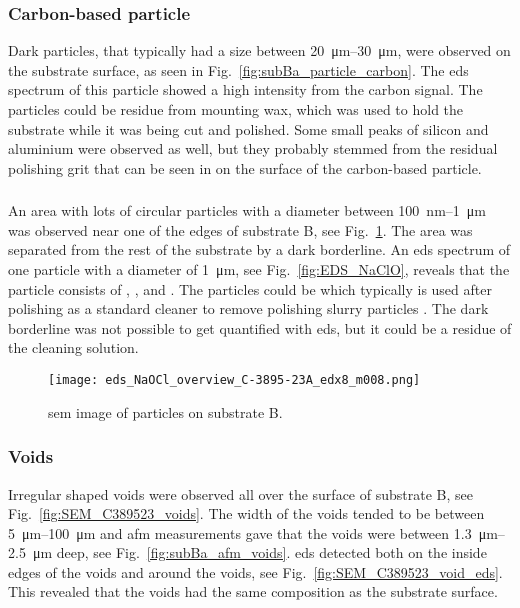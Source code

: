 \subsubsection{Carbon-based particle}
Dark particles, that typically had a size between \SIrange{20}{30}{\micro\metre}, were observed on the substrate surface, as seen in Fig.~\ref{fig:subBa_particle_carbon}. The \ac{eds} spectrum of this particle showed a high intensity from the carbon signal. The particles could be residue from mounting wax, which was used to hold the substrate while it was being cut and polished. Some small peaks of silicon and aluminium were observed as well, but they probably stemmed from the residual polishing grit that can be seen in on the surface of the carbon-based particle.

\subsubsection{}
An area with lots of circular particles with a diameter between \SI{100}{\nano\metre}--\SI{1}{\micro\metre} was observed near one of the edges of substrate B, see Fig.~\ref{fig:eds_NaOCl_overview}. The area was separated from the rest of the substrate by a dark borderline. An \ac{eds} spectrum of one particle with a diameter of \SI{1}{\micro\metre}, see Fig.~\ref{fig:EDS_NaClO}, reveals that the particle consists of , , and . The particles could be  which typically is used after polishing as a standard cleaner to remove polishing slurry particles \citep{benson2015as-received}. The dark borderline was not possible to get quantified with \ac{eds}, but it could be a residue of the cleaning solution.

\begin{figure}[htbp]
    \centering
    \texttt{[image: eds\_NaOCl\_overview\_C-3895-23A\_edx8\_m008.png]}
    \caption[\Ac{sem} image of  particles on substrate B.]{\Ac{sem} image of  particles on substrate B.}
    \label{fig:eds_NaOCl_overview}
\end{figure}


\subsubsection{Voids}
Irregular shaped voids were observed all over the surface of substrate B, see Fig.~\ref{fig:SEM_C389523_voids}. The width of the voids tended to be between \SIrange{5}{100}{\micro\metre} and \ac{afm} measurements gave that the voids were between \SIrange{1.3}{2.5}{\micro\metre} deep, see Fig.~\ref{fig:subBa_afm_voids}. \Ac{eds} detected  both on the inside edges of the voids and around the voids, see Fig.~\ref{fig:SEM_C389523_void_eds}. This revealed that the voids had the same composition as the substrate surface.

